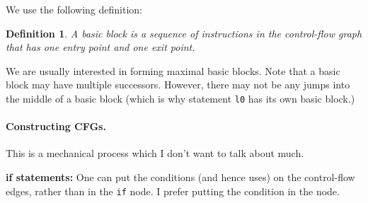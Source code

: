 \documentclass[11pt]{article}
\newtheorem{defn}{Definition}
\begin{document}
We use the following definition:
\begin{defn}
A basic block is a sequence of instructions in the control-flow graph
that has one entry point and one exit point.
\end{defn}
We are usually interested in forming maximal basic blocks.
Note that a basic block may have multiple successors. However, there 
may not be any jumps into the middle of a basic block (which is
why statement {\tt l0} has its own basic block.)

\paragraph{Constructing CFGs.} This is a mechanical process which I don't want to talk about much.

{\bf if statements:} One can put the conditions
(and hence uses) on the control-flow edges, rather than in the 
{\tt if} node. I prefer putting the condition in the node.
\end{document}
